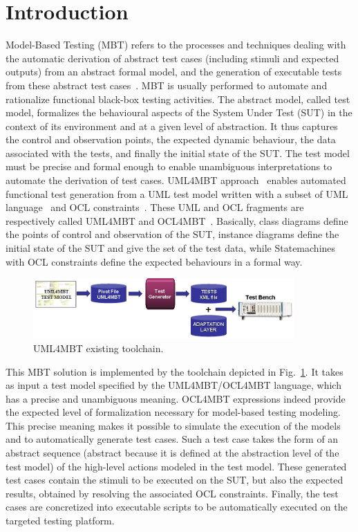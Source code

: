 \documentclass{llncs}
\begin{document}
\section{Introduction}
Model-Based Testing (MBT) refers to the processes and techniques
dealing with the automatic derivation of abstract test cases
(including stimuli and expected outputs) from an abstract formal
model, and the generation of executable tests from these abstract test 
cases~\cite{UL06}. MBT is usually performed to automate and
rationalize functional black-box testing activities. The
abstract model, called test model, formalizes the
behavioural aspects of the System Under Test (SUT) in the context of
its environment and at a given level of abstraction. It thus captures
the control and observation points, the expected dynamic behaviour,
the data associated with the tests, and finally the initial state of
the SUT. The test model must be precise and formal enough to enable
unambiguous interpretations to automate the derivation of test
cases.  
UML4MBT approach~\cite{bglp08} enables automated functional test generation
from a UML test model written with a subset of UML language~\cite{UML04} and OCL
constraints~\cite{OCL96}. These UML and OCL fragments are respectively
called UML4MBT and OCL4MBT~\cite{bglp07}. Basically, class diagrams
define the points of control and observation of the
SUT, instance diagrams define the initial state of the SUT
and give the set of the test data, while Statemachines with OCL
constraints define the expected behaviours in a formal way. 

\begin{figure}[htp]
	\centering
        \includegraphics[width=10cm]{./img/initialToolChain.png}
	\caption{UML4MBT existing toolchain.}
	\label{UML4MBTToolChain}
        \vspace*{-.6cm}
\end{figure}

This MBT solution is implemented by the toolchain depicted in 
Fig.~\ref{UML4MBTToolChain}. It takes as input a test model specified by the
UML4MBT/OCL4MBT language, which has a precise and unambiguous 
meaning. OCL4MBT expressions indeed provide the expected level of
formalization necessary for model-based testing modeling. This precise
meaning makes it possible to simulate the execution of the models and
to automatically generate test cases. Such a test case
takes the form of an abstract sequence (abstract because it is
defined at the abstraction level of the test model) of the high-level
actions modeled in the test model. These generated test cases contain
the stimuli to be executed on the SUT, but also the expected results,
obtained by resolving the associated OCL constraints. Finally, the
test cases are concretized into executable scripts to be
automatically executed on the targeted testing platform.   
\end{document}
